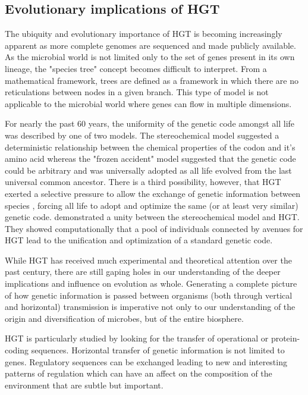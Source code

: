 \subsection*{Evolutionary implications of HGT}

The ubiquity and evolutionary importance of HGT is becoming increasingly
apparent as more complete genomes are sequenced and made publicly available. As
the microbial world is not limited only to the set of genes present in its own
lineage, the "species tree" concept becomes difficult to interpret. From a
mathematical framework, trees are defined as a framework in which there are no
reticulations between nodes in a given branch. This type of model is not
applicable to the microbial world where genes can flow in multiple dimensions.

For nearly the past 60 years, the uniformity of the
genetic code amongst all life was described by one of two models. The
stereochemical model suggested a deterministic relationship between the chemical
properties of the codon and it's amino acid \cite{Grafstein:1983wv} whereas the
"frozen accident" model suggested that the genetic code could be arbitrary and
was universally adopted as all life evolved from the last universal common
ancestor\cite{Crick:1968wg}. There is a third possibility, however, that HGT
exerted a selective pressure to allow the exchange of genetic information
between species \cite{Syvanen:1985vv, Syvanen:2012jn}, forcing all life to adopt
and optimize the same (or at least very similar) genetic
code. \citet{Vestigian:2006va} demonstrated a unity between the stereochemical model
and HGT. They showed computationally that a pool of individuals connected by
avenues for HGT lead to the unification and optimization of a standard genetic
code. 

While HGT has received much experimental and theoretical attention over the past
century, there are still gaping holes in our understanding of the deeper
implications and influence on evolution as whole. Generating a complete picture
of how genetic information is passed between organisms (both through vertical
and horizontal) transmission is imperative not only to our understanding of the
origin and diversification of microbes, but of the entire biosphere.


HGT is particularly studied by looking for the transfer of operational or
protein-coding sequences. Horizontal transfer of genetic information is not
limited to genes.  Regulatory sequences can be exchanged\cite{Oren:2014eea}
leading to new and interesting patterns of regulation which can have an affect
on the composition of the environment that are subtle but important.

